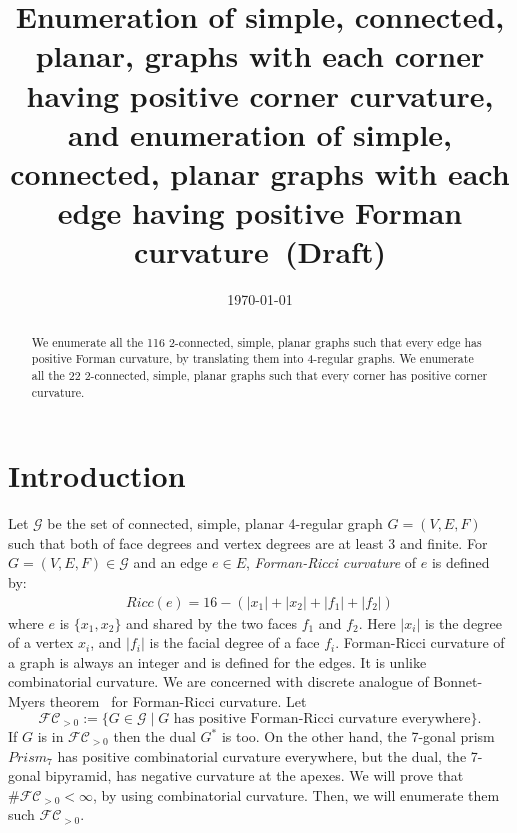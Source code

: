 \documentclass{amsart}
\title[Positive Forman curvature and corner curvature graphs]{
      Enumeration of simple, connected, planar, graphs with each corner having positive corner curvature, and     
      enumeration of simple, connected, planar graphs with each edge having positive Forman curvature~(Draft)
   }
\date{\today} %
\def\G{\mathcal{G}}
\def\PFC{\mathcal{FC}_{>0}}
\begin{document}
\maketitle

\begin{abstract}
We enumerate all the 116 2-connected, simple, planar graphs such that
every edge has positive Forman curvature, by translating them into
4-regular graphs.  We enumerate all the 22 2-connected, simple, planar
graphs such that every corner has positive corner curvature.
\end{abstract}


\section{Introduction}
 Let $\G$ be the set of connected, simple, planar 4-regular
graph $G=(V,E,F)$ such that  both of face degrees and vertex degrees are  at least
3 and finite.
For $G=(V,E,F)\in \G$  and an edge
$e\in E$, \emph{Forman-Ricci curvature} of $e$ is defined by:
\begin{align}
Ricc(e) =
16 - (|x_1|+|x_2|+|f_1|+|f_2|)  \label{def:ricci}
\end{align}
 where $e$ is $\{x_1, x_2\}$ and shared
by the two faces $f_1$ and $f_2$. Here $|x_i|$  is the degree of a
vertex $x_i$, and $|f_i|$ is the facial degree of a face
$f_i$. Forman-Ricci curvature of a graph is always an
integer and is defined for the edges. It is
 unlike combinatorial curvature.
 We are concerned with discrete
analogue of Bonnet-Myers theorem~\cite{MR2299456} for Forman-Ricci
curvature.
Let
\[
\PFC:=\{G\in \G\mid \mbox{$G$ has positive Forman-Ricci curvature everywhere}\}.
\]
If $G$ is in $\PFC$ then the dual $G^*$ is too. On the other hand, the
7-gonal prism $Prism_7$ has positive combinatorial curvature everywhere,
but the dual, the 7-gonal bipyramid, has negative curvature at the apexes.
We will prove that $\#\PFC<\infty$, by using
combinatorial curvature.
Then, we will enumerate them such $\PFC$.
\end{document}
